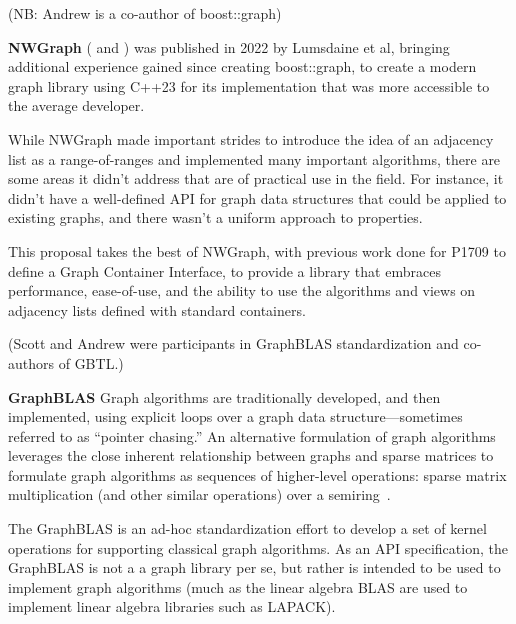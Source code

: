 (NB: Andrew is a co-author of boost::graph)

\medskip

\textbf{NWGraph} (\cite{REF_nwgraph_library} and \cite{REF_nwgraph_paper}) was published in 2022
by Lumsdaine et al, bringing additional experience gained since creating boost::graph, to create a modern graph library using C++23 for its implementation 
that was more accessible to the average developer. %

While NWGraph made important strides to introduce the idea of an adjacency list as a range-of-ranges and implemented many important algorithms,
there are some areas it didn't address that are of practical use in the field. For instance, it didn't have a well-defined API for graph
data structures that could be applied to existing graphs, and there wasn't a uniform approach to properties.

This proposal takes the best of NWGraph, with previous work done for P1709 to define a Graph Container Interface, to provide a library that
embraces performance, ease-of-use, and the ability to use the algorithms and views on adjacency lists defined with standard containers.

(Scott and Andrew were participants in GraphBLAS standardization and co-authors of GBTL.)

\medskip

\textbf{GraphBLAS}
Graph algorithms are traditionally developed, and then implemented, using explicit loops
over a graph data structure---sometimes referred to as ``pointer chasing.''
An alternative formulation of graph algorithms leverages the close inherent relationship between
graphs and sparse matrices to formulate graph algorithms as sequences of higher-level operations:
sparse matrix multiplication (and other similar operations) over a semiring~\cite{kepner-gilbert}.

The GraphBLAS is an ad-hoc
standardization effort to develop a set of kernel operations for supporting classical
graph algorithms.  As an API specification, the GraphBLAS is not a a graph library per se, 
but rather is intended to be
used to implement graph algorithms (much as the linear algebra BLAS are used  to implement
linear algebra libraries such as LAPACK).

